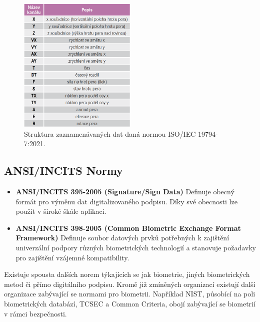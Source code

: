 \begin{figure}[h]
  \centering
  \includegraphics[width=0.5\textwidth]{obrazky-figures/normy.png}
  \caption{Struktura zaznamenávaných dat daná normou ISO/IEC 19794-7:2021.~\cite{DSM2021}} %
  \label{fig:norms_table}
\end{figure}

\newpage

\subsection*{ANSI/INCITS Normy}
\begin{itemize}
  \item \textbf{ANSI/INCITS 395-2005 (Signature/Sign Data)}  
  Definuje obecný formát pro výměnu dat digitalizovaného podpisu. Díky své obecnosti lze použít v široké škále aplikací.~\cite{ANSI_INCITS_395_2005} %
  
  \item \textbf{ANSI/INCITS 398-2005 (Common Biometric Exchange Format Framework)}  
  Definuje soubor datových prvků potřebných k zajištění univerzální podpory různých biometrických technologií a stanovuje požadavky pro zajištění vzájemné kompatibility.~\cite{DrahanskýMartin2011} %
\end{itemize}

Existuje spousta dalších norem týkajících se jak biometrie, jiných biometrických metod či přímo digitálního podpisu.                %
Kromě již zmíněných organizací existují další organizace zabývající se normami pro biometrii.                                      %
Například NIST, působící na poli biometrických databází, TCSEC a Common Criteria, obojí zabývající se biometrií v rámci bezpečnosti.~\cite{DrahanskýMartin2011}%

